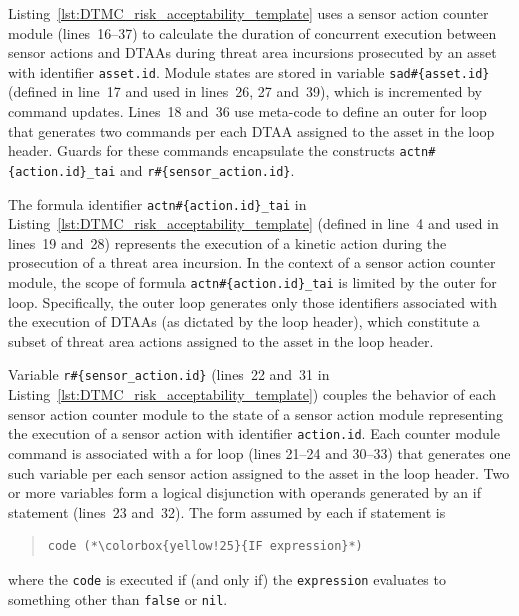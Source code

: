 Listing~\ref{lst:DTMC_risk_acceptability_template} uses a sensor action counter module (lines~16--37) to calculate the duration of concurrent execution between sensor actions and DTAAs during threat area incursions prosecuted by an asset with identifier \texttt{asset.id}. Module states are stored in variable \texttt{sad\#\{asset.id\}} (defined in line~17 and used in lines~26, 27 and~39), which is incremented by command updates. Lines~18 and~36 use meta-code to define an outer for loop that generates two commands per each DTAA assigned to the asset in the loop header. Guards for these commands encapsulate the constructs \texttt{actn\#\{action.id\}\_tai} and \texttt{r\#\{sensor\_action.id\}}.

The formula identifier \texttt{actn\#\{action.id\}\_tai} in Listing~\ref{lst:DTMC_risk_acceptability_template} (defined in line~4 and used in lines~19 and~28) represents the execution of a kinetic action during the prosecution of a threat area incursion. In the context of a sensor action counter module, the scope of formula \texttt{actn\#\{action.id\}\_tai} is limited by the outer for loop. Specifically, the outer loop generates only those identifiers associated with the execution of DTAAs (as dictated by the loop header), which constitute a subset of threat area actions assigned to the asset in the loop header.

Variable \texttt{r\#\{sensor\_action.id\}} (lines~22 and~31 in Listing~\ref{lst:DTMC_risk_acceptability_template}) couples the behavior of each sensor action counter module to the state of a sensor action module representing the execution of a sensor action with identifier \texttt{action.id}. Each counter module command is associated with a for loop (lines 21--24 and 30--33) that generates one such variable per each sensor action assigned to the asset in the loop header. Two or more variables form a logical disjunction with operands generated by an if statement (lines~23 and~32). The form assumed by each if statement is

\begin{quote}
\begin{lstlisting}[frame=none,numbers=none]
code (*\colorbox{yellow!25}{IF expression}*)
\end{lstlisting}
\end{quote}

\noindent where the \texttt{code} is executed if (and only if) the \texttt{expression} evaluates to something other than \texttt{false} or \texttt{nil}.

